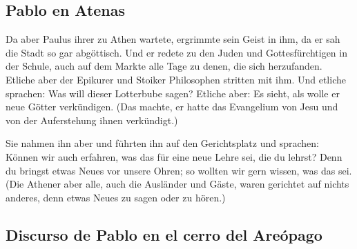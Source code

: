 \hypertarget{pablo-en-atenas}{%
\subsection{Pablo en Atenas}\label{pablo-en-atenas}}

 Da aber Paulus ihrer zu Athen wartete, ergrimmte sein
Geist in ihm, da er sah die Stadt so gar abgöttisch.  Und
er redete zu den Juden und Gottesfürchtigen in der Schule, auch auf dem
Markte alle Tage zu denen, die sich herzufanden.  Etliche
aber der Epikurer und Stoiker Philosophen stritten mit ihm. Und etliche
sprachen: Was will dieser Lotterbube sagen? Etliche aber: Es sieht, als
wolle er neue Götter verkündigen. (Das machte, er hatte das Evangelium
von Jesu und von der Auferstehung ihnen verkündigt.)

 Sie nahmen ihn aber und führten ihn auf den
Gerichtsplatz und sprachen: Können wir auch erfahren, was das für eine
neue Lehre sei, die du lehrst?  Denn du bringst etwas
Neues vor unsere Ohren; so wollten wir gern wissen, was das sei.
 (Die Athener aber alle, auch die Ausländer und Gäste,
waren gerichtet auf nichts anderes, denn etwas Neues zu sagen oder zu
hören.)

\hypertarget{discurso-de-pablo-en-el-cerro-del-areuxf3pago}{%
\subsection{Discurso de Pablo en el cerro del
Areópago}\label{discurso-de-pablo-en-el-cerro-del-areuxf3pago}}

